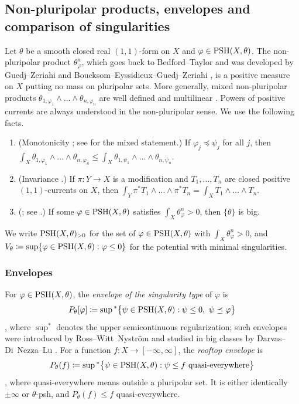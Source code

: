 \documentclass[11pt,a4paper]{amsart}
\newcommand{\lessing}{\preceq}                   %
\theoremstyle{definition}
\begin{document}
\subsection{Non-pluripolar products, envelopes and comparison of
singularities}\label{sec:npp}

Let $\theta$ be a smooth closed real $(1,1)$-form on $X$ and
$\varphi\in\mathrm{PSH}(X,\theta)$. The non-pluripolar product
$\theta_\varphi^n$, which goes back to Bedford--Taylor \cite{BT87} and
was developed by Guedj--Zeriahi \cite{GZ07} and
Boucksom--Eyssidieux--Guedj--Zeriahi \cite{BEGZ10}, is a positive measure
on $X$ putting no mass on pluripolar sets. More generally, mixed
non-pluripolar products
$\theta_{1,\varphi_1}\wedge\dots\wedge\theta_{n,\varphi_n}$ are well
defined and multilinear \cite[Proposition~2.2.1]{XiaSGPT}. Powers of
positive currents are always understood in the non-pluripolar sense. We
use the following facts.
\begin{enumerate}[label=(\alph*),leftmargin=*,itemsep=.2em,topsep=.3em]
\item\label{it:monotone} (Monotonicity \cite{WN19,DDNL18mono}; see
  \cite[Theorem~2.4.3]{XiaSGPT} for the mixed statement.) If
  $\varphi_j\lessing\psi_j$ for all $j$, then
  $\int_X\theta_{1,\varphi_1}\wedge\dots\wedge\theta_{n,\varphi_n}
  \le\int_X\theta_{1,\psi_1}\wedge\dots\wedge\theta_{n,\psi_n}$.
\item\label{it:invariance} (Invariance \cite[Proposition~2.4.2]{XiaSGPT}.)
  If $\pi\colon Y\to X$ is a modification and $T_1,\dots,T_n$ are
  closed positive $(1,1)$-currents on $X$, then
  $\int_Y\pi^*T_1\wedge\dots\wedge\pi^*T_n=\int_XT_1\wedge\dots\wedge T_n$.
\item\label{it:bigness} (\cite[Proposition~1.22]{BEGZ10}; see
  \cite[Proposition~2.4.1]{XiaSGPT}.) If some $\varphi\in\mathrm{PSH}(X,\theta)$
  satisfies $\int_X\theta_\varphi^n>0$, then $\{\theta\}$ is big.
\end{enumerate}
We write $\mathrm{PSH}(X,\theta)_{>0}$ for the set of $\varphi\in\mathrm{PSH}(X,\theta)$
with $\int_X\theta_\varphi^n>0$, and
$V_\theta\coloneqq \sup\{\varphi\in\mathrm{PSH}(X,\theta):\varphi\le0\}$ for the
potential with minimal singularities.

\subsubsection*{Envelopes}
For $\varphi\in\mathrm{PSH}(X,\theta)$, the \emph{envelope of the singularity
type} of $\varphi$ is
\[
  P_\theta[\varphi]
  \coloneqq \sup{}^*\bigl\{\psi\in\PSH(X,\theta):\psi\le0,\ \psi\lessing\varphi\bigr\}
\]
\cite[Definition~3.1.2]{XiaSGPT}, where $\sup^*$ denotes the upper
semicontinuous regularization; such envelopes were introduced by
Ross--Witt~Nystr\"om \cite{RWN14} and studied in big classes by
Darvas--Di~Nezza--Lu \cite{DDNL18full,DDNL18mono}. For a function
$f\colon X\to[-\infty,\infty]$, the \emph{rooftop envelope} is
\[
  P_\theta(f)\coloneqq \sup{}^*\bigl\{\psi\in\mathrm{PSH}(X,\theta):
     \psi\le f\ \text{quasi-everywhere}\bigr\}
\]
\cite[Definition~2.4.1]{XiaSGPT}, where quasi-everywhere means outside a
pluripolar set. It is either identically $\pm\infty$ or $\theta$-psh, and
$P_\theta(f)\le f$ quasi-everywhere.
\end{document}
